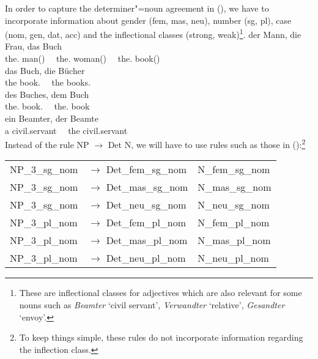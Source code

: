 In order to capture the determiner"=noun agreement in (), we have to incorporate information about gender (fem, mas, neu),
number (sg, pl), case (nom, gen, dat, acc) and the inflectional classes (strong, weak)\footnote{%
These are inflectional classes for adjectives which are also relevant for some nouns such as \emph{Beamter} `civil servant', 
\emph{Verwandter} `relative', \emph{Gesandter} `envoy'.
}.
\eal\settowidth{}
\ex 
\gll der Mann, die Frau, das Buch\\
     the.\mas{} man(\mas)~~ the.\fem{} woman(\fem)~~ the.\neu{} book(\neu)\\
\ex 
\gll das Buch, die Bücher\\
     the book.\SG{}~~ the books.\PL\\
\ex 
\gll des Buches, dem Buch\\
     the.\GEN{} book.\GEN{}~~ the.\DAT{} book\\
\ex{} 
\gll ein Beamter,     der Beamte\\
     a civil.servant~~ the civil.servant\\
\zl
Instead of the rule NP $\to$ Det N, we will have to use rules such as those in ():\footnote{%
  To keep things simple, these rules do not incorporate information regarding the inflection class.
}
\ea
\begin{tabular}[t]{@{}l@{ }l@{~~}l}
NP\_3\_sg\_nom  & $\to$ Det\_fem\_sg\_nom & N\_fem\_sg\_nom \\
NP\_3\_sg\_nom  & $\to$ Det\_mas\_sg\_nom & N\_mas\_sg\_nom \\
NP\_3\_sg\_nom  & $\to$ Det\_neu\_sg\_nom & N\_neu\_sg\_nom \\
NP\_3\_pl\_nom  & $\to$ Det\_fem\_pl\_nom & N\_fem\_pl\_nom \\
NP\_3\_pl\_nom  & $\to$ Det\_mas\_pl\_nom & N\_mas\_pl\_nom \\
NP\_3\_pl\_nom  & $\to$ Det\_neu\_pl\_nom & N\_neu\_pl\_nom \\[2mm]
\end{tabular}

